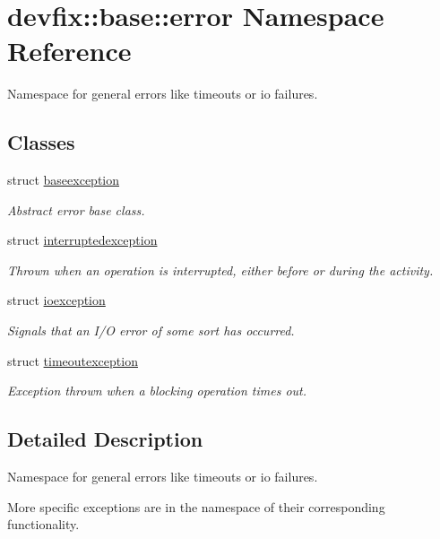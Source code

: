 \hypertarget{namespacedevfix_1_1base_1_1error}{}\section{devfix\+:\+:base\+:\+:error Namespace Reference}
\label{namespacedevfix_1_1base_1_1error}


Namespace for general errors like timeouts or io failures.  


\subsection*{Classes}
\begin{DoxyCompactItemize}
\item 
struct \hyperlink{structdevfix_1_1base_1_1error_1_1baseexception}{baseexception}
\begin{DoxyCompactList}\small\item\em Abstract error base class. \end{DoxyCompactList}\item 
struct \hyperlink{structdevfix_1_1base_1_1error_1_1interruptedexception}{interruptedexception}
\begin{DoxyCompactList}\small\item\em Thrown when an operation is interrupted, either before or during the activity. \end{DoxyCompactList}\item 
struct \hyperlink{structdevfix_1_1base_1_1error_1_1ioexception}{ioexception}
\begin{DoxyCompactList}\small\item\em Signals that an I/O error of some sort has occurred. \end{DoxyCompactList}\item 
struct \hyperlink{structdevfix_1_1base_1_1error_1_1timeoutexception}{timeoutexception}
\begin{DoxyCompactList}\small\item\em Exception thrown when a blocking operation times out. \end{DoxyCompactList}\end{DoxyCompactItemize}


\subsection{Detailed Description}
Namespace for general errors like timeouts or io failures. 

More specific exceptions are in the namespace of their corresponding functionality. 